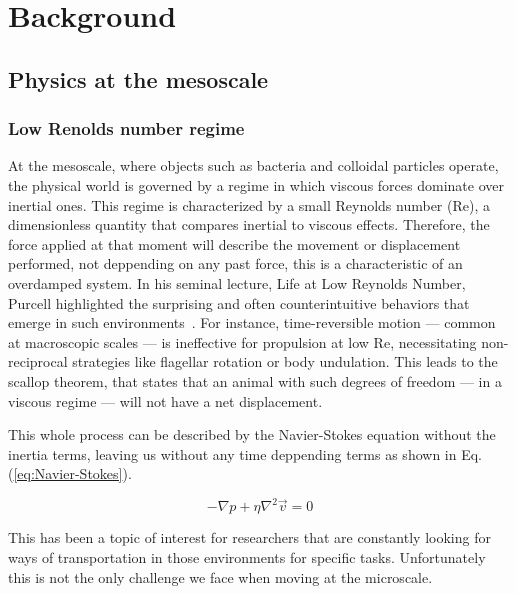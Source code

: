 \part{Background}
\label{part:background}

\chapter{Physics at the mesoscale}
\label{ch:swimming at the mesoscale}


\section{Low Renolds number regime}
\label{st:lowreynoldsnumber}

At the mesoscale, where objects such as bacteria and colloidal particles operate, the physical world is governed by a regime in which viscous forces dominate over inertial ones. This regime is characterized by a small Reynolds number (Re), a dimensionless quantity that compares inertial to viscous effects. Therefore, the force applied at that moment will describe the movement or displacement performed, not deppending on any past force, this is a characteristic of an overdamped system. In his seminal lecture, Life at Low Reynolds Number, Purcell highlighted the surprising and often counterintuitive behaviors that emerge in such environments~\cite{purcell2014life}. For instance, time-reversible motion — common at macroscopic scales — is ineffective for propulsion at low Re, necessitating non-reciprocal strategies like flagellar rotation or body undulation. This leads to the scallop theorem, that states that an animal with such degrees of freedom — in a viscous regime — will not have a net displacement. 

This whole process can be described by the Navier-Stokes equation without the inertia terms, leaving us without any time deppending terms as shown in Eq. (\ref{eq:Navier-Stokes}). 

\begin{equation}
  - \nabla p + \eta \nabla ^2 \vec{v} = 0
  \label{eq:Navier-Stokes}
\end{equation}

This has been a topic of interest for researchers that are constantly looking for ways of transportation in those environments for specific tasks. Unfortunately this is not the only challenge we face when moving at the microscale.

